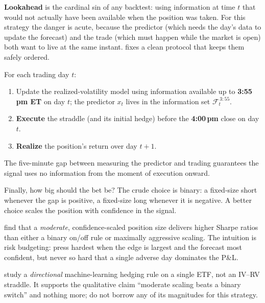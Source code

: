 \textbf{Lookahead} is the cardinal sin of any backtest: using information at time $t$ that would not actually have been available when the position was taken. For this strategy the danger is acute, because the predictor (which needs the day's data to update the forecast) and the trade (which must happen while the market is open) both want to live at the same instant. \citet{Pollok2025} fixes a clean protocol that keeps them safely ordered.

\begin{keyidea}
For each trading day $t$:
\begin{enumerate}
  \item Update the realized-volatility model using information available up to \textbf{3:55\,pm ET} on day $t$; the predictor $x_t$ lives in the information set $\mathcal{F}_t^{\,3:55}$.
  \item \textbf{Execute} the straddle (and its initial hedge) before the \textbf{4:00\,pm} close on day $t$.
  \item \textbf{Realize} the position's return over day $t+1$.
\end{enumerate}
The five-minute gap between measuring the predictor and trading guarantees the signal uses no information from the moment of execution onward.
\end{keyidea}

Finally, how big should the bet be? The crude choice is binary: a fixed-size short whenever the gap is positive, a fixed-size long whenever it is negative. A better choice scales the position with confidence in the signal.

\begin{keyidea}
\citet{LiWu2026} find that a \emph{moderate}, confidence-scaled position size delivers higher Sharpe ratios than either a binary on/off rule or maximally aggressive scaling. The intuition is risk budgeting: press hardest when the edge is largest and the forecast most confident, but never so hard that a single adverse day dominates the P\&L.
\end{keyidea}

\begin{warning}
\citet{LiWu2026} study a \emph{directional} machine-learning hedging rule on a single ETF, not an IV--RV straddle. It supports the qualitative claim ``moderate scaling beats a binary switch'' and nothing more; do not borrow any of its magnitudes for this strategy.
\end{warning}

